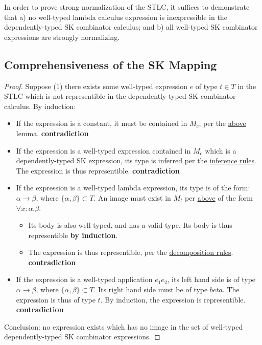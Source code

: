 \documentclass[11pt]{article}
\begin{document}
In order to prove strong normalization of the STLC, it suffices to demonstrate that a) no well-typed lambda calculus expression is inexpressible in the dependently-typed SK combinator calculus; and b) all well-typed SK combinator expressions are strongly normalizing.
\subsection{Comprehensiveness of the SK Mapping}
\label{sec:org753cebf}

\begin{proof}
Suppose (1) there exists some well-typed expression $e$ of type $t \in T$ in the STLC which is not representible in the dependently-typed SK combinator calculus. By induction: \\
\begin{itemize}
\item{If the expression is a constant, it must be contained in $M_{c}$, per the \href{maplemma:1}{above} lemma. \textbf{contradiction}} \\
\item{If the expression is a well-typed expression contained in $M_{c}$ which is a dependently-typed SK expression, its type is inferred per the \href{inference:1}{inference rules}. The expression is thus representible. \textbf{contradiction}} \\
\item If the expression is a well-typed lambda expression, its type is of the form: $\alpha \rightarrow \beta$, where $\{\alpha, \beta\} \subset T$. An image must exist in $M_{t}$ per \href{maplemma:1}{above} of the form $\forall x : \alpha.\beta$. \\
\begin{itemize}
  \item{Its body is also well-typed, and has a valid type. Its body is thus representible \textbf{by induction}.} \\
  \item{The expression is thus representible, per the \href{decomplemma:1}{decomposition rules}. \textbf{contradiction}} \\
\end{itemize}
\item{If the expression is a well-typed application $e_{1} e_{2}$, its left hand side is of type $\alpha \rightarrow \beta$, where $\{\alpha, \beta\} \subset T$. Its right hand side must be of type $beta$. The expression is thus of type $t$. By induction, the expression is representible. \textbf{contradiction}} \\
\end{itemize}

Conclusion: no expression exists which has no image in the set of well-typed dependently-typed SK combinator expressions.
\end{proof}
\end{document}
